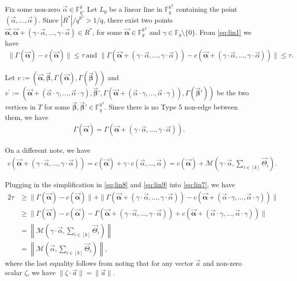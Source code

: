 \documentclass[11pt]{article}
\newcommand{\F}{\mathbb{F}}
\renewcommand{\ge}{ \geqslant}
\renewcommand{\le}{ \leqslant}
\newcommand{\alphab}{\vec{\bm{\alpha}}}
\newcommand{\betab}{\vec{\bm{\beta}}}
\renewcommand{\kappa}{\tau}
\newcommand{\M}{\mathcal{M}}
\begin{document}
Fix some non-zero $\vec{\alpha}\in \F_q^k$.   Let $L_0$ be a linear line in $\F_q^{k^2}$  containing   the point $(\vec{\alpha},\ldots ,\vec{\alpha})$. Since $|{R}^\ast|/q^{k^2}>1/q$,  there exist two points  $\vec{\bm{\alpha}},\vec{\bm{\alpha}}+(\gamma\cdot \vec{\alpha},\ldots ,\gamma\cdot\vec{\alpha})\in {R}^\ast$, for some $\alphab\in\F_q^{k^2}$ and $\gamma\in \F_q\setminus\{0\}$. 
  From \eqref{eq:lin1} we have
\begin{align}
\|\Gamma(\vec{\bm{\alpha}})-c(\vec{\bm{\alpha}})\|\le \kappa\ \text{and } \|\Gamma(\vec{\bm{\alpha}}+(\gamma\cdot \vec{\alpha},\ldots ,\gamma\cdot\vec{\alpha}))-c(\vec{\bm{\alpha}}+(\gamma\cdot \vec{\alpha},\ldots ,\gamma\cdot\vec{\alpha}))\|\le \kappa. 
\label{eq:lin7}
\end{align}

Let $v:=(\alphab,\betab,\Gamma(\alphab),\Gamma(\betab))$ and 
$v^{\prime}:=(\alphab+(\vec{\alpha}\cdot\gamma,\ldots ,\vec{\alpha}\cdot\gamma),\betab',\Gamma(\alphab+(\vec{\alpha}\cdot\gamma,\ldots ,\vec{\alpha}\cdot\gamma)),\Gamma(\betab'))$ be the two vertices in $T$ for some $\betab,\betab'\in\F_q^{k^2}$. Since   there is no Type 5 non-edge between them, we have 
\begin{align}
\Gamma(\alphab)=\Gamma(\alphab+(\gamma\cdot \vec{\alpha},\ldots ,\gamma\cdot\vec{\alpha})).\label{eq:lin8}
\end{align}




On a different note, we have
\begin{align}
c(\vec{\bm{\alpha}}+(\gamma\cdot \vec{\alpha},\ldots ,\gamma\cdot\vec{\alpha}))=c(\vec{\bm{\alpha}})+\gamma\cdot c(\vec{\alpha},\ldots ,\vec{\alpha})=c(\vec{\bm{\alpha}})+\M\left(\gamma\cdot \vec{\alpha},\underset{i\in[k]}{\sum}\vec{\Theta}_i\right).
\label{eq:lin9}
\end{align}

Plugging in the simplification in \eqref{eq:lin8} and \eqref{eq:lin9} into \eqref{eq:lin7}, we have
\allowdisplaybreaks
\begin{align}
2\kappa&\ge\|\Gamma(\vec{\bm{\alpha}})-c(\vec{\bm{\alpha}})\|+\|\Gamma(\vec{\bm{\alpha}}+(\gamma\cdot \vec{\alpha},\ldots ,\gamma\cdot\vec{\alpha}))-c(\vec{\bm{\alpha}}+(\vec{\alpha}\cdot\gamma,\ldots ,\vec{\alpha}\cdot\gamma))\|\nonumber\\
&\ge\|\Gamma(\vec{\bm{\alpha}})-c(\vec{\bm{\alpha}})-\Gamma(\vec{\bm{\alpha}}+(\gamma\cdot \vec{\alpha},\ldots ,\gamma\cdot\vec{\alpha}))+c(\vec{\bm{\alpha}}+(\vec{\alpha}\cdot\gamma,\ldots ,\vec{\alpha}\cdot\gamma))\|\nonumber\\
&=\left\|\M\left(\gamma\cdot \vec{\alpha},\underset{i\in[k]}{\sum}\vec{\Theta}_i\right) \right\|\nonumber\\
&=\left\|\M\left( \vec{\alpha},\underset{i\in[k]}{\sum}\vec{\Theta}_i\right)\right\|\label{eqzero},
\end{align}
 where the last equality follows from noting that for any vector $\vec{a}$ and non-zero scalar $\zeta$, we have $\|\zeta\cdot \vec{a}\|=\|\vec{a}\|$.
 
\end{document}
